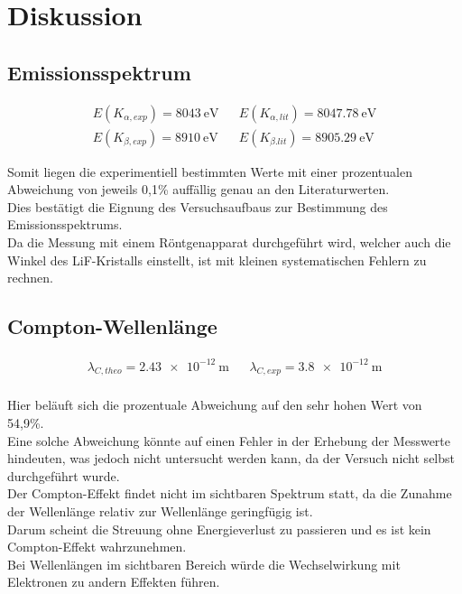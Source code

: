 \section{Diskussion}
\label{sec:Diskussion}

\subsection{Emissionsspektrum}
\label{subsec:disk_emission}

\begin{align*}
    E(K_{\alpha,exp}) = \SI{8043}{\electronvolt} &&  E(K_{\alpha,lit}) = \SI{8047,78}{\electronvolt}\\
    E(K_{\beta,exp}) = \SI{8910}{\electronvolt}  &&  E(K_{\beta.lit}) = \SI{8905,29}{\electronvolt}
\end{align*}

Somit liegen die experimentiell bestimmten Werte mit einer prozentualen Abweichung von jeweils 0,1\% auffällig
genau an den Literaturwerten. \\
Dies bestätigt die Eignung des Versuchsaufbaus zur Bestimmung des Emissionsspektrums.\\
Da die Messung mit einem Röntgenapparat durchgeführt wird, welcher auch die Winkel des LiF-Kristalls einstellt, ist mit kleinen systematischen Fehlern zu rechnen.\\





\subsection{Compton-Wellenlänge}
\label{subsec:disk_compton}

\begin{align*}
    \lambda_{C, theo} = \SI{2,43e-12}{\meter} && \lambda_{C, exp} = \SI{3,8e-12}{\meter}\\
\end{align*}

Hier beläuft sich die prozentuale Abweichung auf den sehr hohen Wert von 54,9\%.\\
Eine solche Abweichung könnte auf einen Fehler in der Erhebung der Messwerte hindeuten, was jedoch nicht untersucht werden kann, 
da der Versuch nicht selbst durchgeführt wurde.\\
Der Compton-Effekt findet nicht im sichtbaren Spektrum statt, da die Zunahme der Wellenlänge
relativ zur Wellenlänge geringfügig ist.\\
Darum scheint die Streuung ohne Energieverlust zu passieren und es ist kein Compton-Effekt wahrzunehmen.\\
Bei Wellenlängen im sichtbaren Bereich würde die Wechselwirkung mit Elektronen zu andern Effekten führen.\\